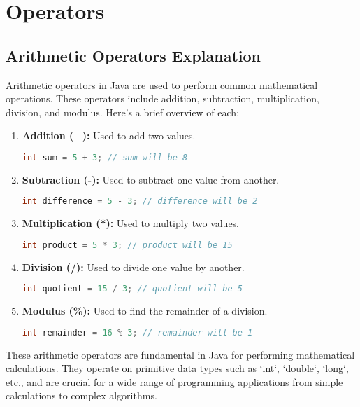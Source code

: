 \documentclass{article}
\begin{document}
\section{Operators}
\subsection{Arithmetic Operators Explanation}

Arithmetic operators in Java are used to perform common mathematical operations. These operators include addition, subtraction, multiplication, division, and modulus. Here's a brief overview of each:

\begin{enumerate}
  \item \textbf{Addition (+):}
  Used to add two values.
  \begin{lstlisting}[language=Java]
int sum = 5 + 3; // sum will be 8
  \end{lstlisting}

  \item \textbf{Subtraction (-):}
  Used to subtract one value from another.
  \begin{lstlisting}[language=Java]
int difference = 5 - 3; // difference will be 2
  \end{lstlisting}

  \item \textbf{Multiplication (*):}
  Used to multiply two values.
  \begin{lstlisting}[language=Java]
int product = 5 * 3; // product will be 15
  \end{lstlisting}

  \item \textbf{Division (/):}
  Used to divide one value by another.
  \begin{lstlisting}[language=Java]
int quotient = 15 / 3; // quotient will be 5
  \end{lstlisting}

  \item \textbf{Modulus (\%):}
  Used to find the remainder of a division.
  \begin{lstlisting}[language=Java]
int remainder = 16 % 3; // remainder will be 1
  \end{lstlisting}
\end{enumerate}

\begin{text}

These arithmetic operators are fundamental in Java for performing mathematical calculations. They operate on primitive data types such as `int`, `double`, `long`, etc., and are crucial for a wide range of programming applications from simple calculations to complex algorithms.

\end{text}
\end{document}
